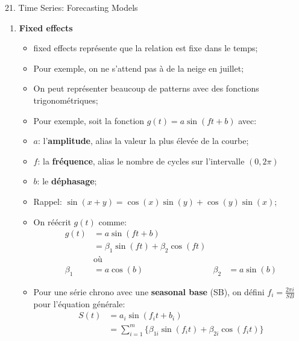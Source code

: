 \documentclass[12pt, titlepage, french]{report}
\begin{document}
\begin{CHPT_SUMM}[label = {timeseries21}]{21. Time Series: Forecasting Models}
\begin{enumerate}
\begin{itemize}
		\texttt{[image: src/sine-wave-autocorrelation.png]}
		\item[]	Il y a de l'autocorrélation cyclique;
		\item[] La 1ère valeur est très semblable à la 24ème, la 12ème à la 36ème, etc. et donc nous allons observer des valeurs très semblables à chaque 24 unité de temps;
		\item[]	De plus, le graphique \textbf{ressemble} évidemment \textbf{à une fonction sinusoïdale};
		\item 	Alors, nous avons un cycle \textbf{saisonnale} pouvant être \textbf{estimé par une fonction sinusoïdale};
		\end{itemize}
	\item[]	\textbf{Fixed effects}
		\begin{itemize}
		\item	\og fixed effects \fg{} représente que la relation est fixe dans le temps;
		\item[]	Pour exemple, on ne s'attend pas à de la neige en juillet;
		\item	On peut représenter beaucoup de patterns avec des fonctions trigonométriques;
		\item	Pour exemple, soit la fonction $g(t) = a \sin (f t + b)$ avec:
		\item[]	$a$: l'\textbf{amplitude}, alias la valeur la plus élevée de la courbe;
		\item[]	$f$: la \textbf{fréquence}, alias le nombre de cycles sur l'intervalle $(0, 2\pi)$
		\item[]	$b$: le \textbf{déphasage};
		\item	Rappel: $\sin(x + y) = \cos(x) \sin(y) + \cos(y) \sin(x)$;
		\item	On réécrit $g(t)$ comme:
		\begin{align*}
			g(t)
				&=	a \sin (f t + b)	\\
				&=	\beta_{1} \sin(ft) + \beta_{2} \cos(ft)	\\
			&\text{où}\\
			\beta_{1}	
				&=	a \cos (b)	&
			\beta_{2}	
				&=	a \sin (b)	
		\end{align*}
		\item	Pour une série chrono avec une \textbf{seasonal base} (SB), on défini $f_{i} = \frac{2\pi i}{SB}$ pour l'équation générale:
		\begin{align*}
			S(t)
				&=	a_{i	} \sin (f_{i} t + b_{i})	\\
				&=	\sum_{i = 1}^{m} \{ \beta_{1i} \sin(f_{i}t) + \beta_{2i} \cos(f_{i}t)	 \} 

\end{align*}
\end{itemize}
\end{enumerate}
\end{CHPT_SUMM}
\end{document}
